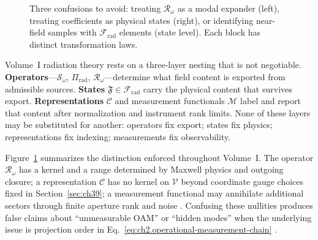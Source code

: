 \begin{figure}[t]
\centering
{}
\caption{Three confusions to avoid: treating \(\mathcal{R}_\omega\) as a modal expander (left),
treating coefficients as physical states (right), or identifying near-field samples with
\(\mathcal{F}_{\mathrm{rad}}\) elements (state level). Each block has distinct transformation laws.}
\label{fig:ch3.three-level-distinction}
\end{figure}
\begin{principle}
\label{prin:ch3.osr-separation}
Volume~I radiation theory rests on a three-layer nesting that is not negotiable.
\textbf{Operators}---\(\mathcal{S}_\omega\), \(\Pi_{\mathrm{rad}}\), \(\mathcal{R}_\omega\)---determine
what field content is exported from admissible sources.
\textbf{States} \(\mathfrak{F}\in\mathcal{F}_{\mathrm{rad}}\) carry the physical content that survives export.
\textbf{Representations} \(\mathcal{C}\) and measurement functionals \(\mathcal{M}\) label and report that
content after normalization and instrument rank limits.
None of these layers may be substituted for another: operators fix export; states fix physics;
representations fix indexing; measurements fix observability.
\end{principle}
Figure~\ref{fig:ch3.three-level-distinction} summarizes the distinction enforced throughout Volume~I. The operator \(\mathcal{R}_\omega\) has a kernel and a range determined by Maxwell physics and outgoing closure; a representation \(\mathcal{C}\) has no kernel on \(\mathcal{V}\) beyond coordinate gauge choices fixed in Section~\ref{sec:ch39}; a measurement functional may annihilate additional sectors through finite aperture rank and noise . Confusing these nullities produces false claims about ``unmeasurable OAM'' or ``hidden modes'' when the underlying issue is projection order in Eq.~\eqref{eq:ch2.operational-measurement-chain} .

